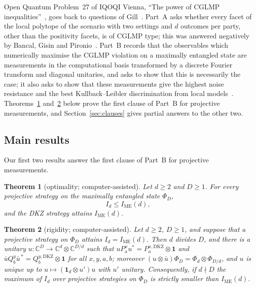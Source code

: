 \documentclass[11pt]{amsart}
\newtheorem{introthm}{Theorem}
\theoremstyle{definition}
\theoremstyle{remark}
\numberwithin{equation}{section}
\newcommand{\C}{\mathbb{C}}
\newcommand{\IME}{I_{\mathrm{ME}}}
\newcommand{\one}{\mathbf{1}}
\begin{document}
Open Quantum Problem~27 of IQOQI Vienna, ``The power of CGLMP inequalities''~\cite{OQP}, goes back to questions of
Gill~\cite{Gill}. Part~A asks whether every facet of the local polytope of the scenario with two settings and $d$
outcomes per party, other than the positivity facets, is of CGLMP type; this was answered negatively by Bancal,
Gisin and Pironio~\cite{BGP}. Part~B records that the observables which numerically maximise the CGLMP violation on
a maximally entangled state are measurements in the computational basis transformed by a discrete Fourier transform
and diagonal unitaries, and asks to show that this is necessarily the case; it also asks to show that these
measurements give the highest noise resistance and the best Kullback--Leibler discrimination from local
models~\cite{vDGG}. Theorems~\ref{thm:A} and~\ref{thm:B} below prove the first clause of Part~B for projective
measurements, and Section~\ref{sec:clauses} gives partial answers to the other two.

\subsection{Main results}
Our first two results answer the first clause of Part~B for projective measurements.

\begin{introthm}[optimality; computer-assisted]\label{thm:A}
Let $d\ge2$ and $D\ge1$. For every projective strategy on the maximally entangled state $\Phi_D$,
\[
I_d\le\IME(d),
\]
and the DKZ strategy attains $\IME(d)$.
\end{introthm}

\begin{introthm}[rigidity; computer-assisted]\label{thm:B}
Let $d\ge2$, $D\ge1$, and suppose that a projective strategy on $\Phi_D$ attains $I_d=\IME(d)$. Then $d$ divides $D$,
and there is a unitary $u\colon\C^D\to\C^d\otimes\C^{D/d}$ such that
$uP^x_au^*=P^{x,\mathrm{DKZ}}_a\otimes\one$ and $\bar uQ^y_b\bar u^{\,*}=Q^{y,\mathrm{DKZ}}_b\otimes\one$ for all
$x,y,a,b$; moreover $(u\otimes\bar u)\Phi_D=\Phi_d\otimes\Phi_{D/d}$, and $u$ is unique up to $u\mapsto(\one_d\otimes u')u$
with $u'$ unitary. Consequently, if $d\nmid D$ the maximum of $I_d$ over projective strategies on $\Phi_D$ is
strictly smaller than $\IME(d)$.
\end{introthm}
\end{document}
